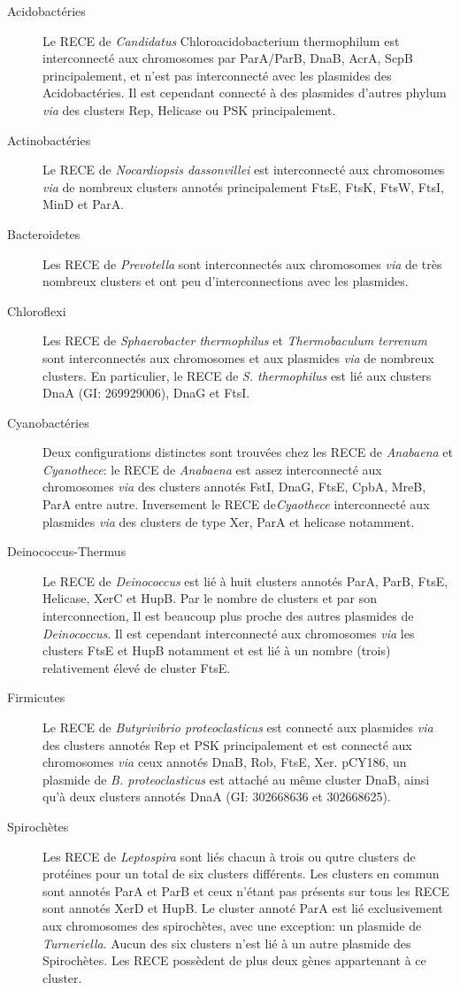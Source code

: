 \begin{description}
\begin{itemize}
 	\end{itemize}
\item[Acidobactéries] Le RECE de \textit{Candidatus} Chloroacidobacterium thermophilum est interconnecté aux chromosomes par ParA/ParB, DnaB, AcrA, ScpB principalement, et n'est pas interconnecté avec les plasmides des Acidobactéries. Il est cependant connecté à des plasmides d'autres phylum \textit{via} des clusters Rep, Helicase ou PSK principalement.
 \item[Actinobactéries] Le RECE de \textit{Nocardiopsis dassonvillei} est interconnecté aux chromosomes \textit{via} de nombreux clusters annotés principalement FtsE, FtsK, FtsW, FtsI, MinD et ParA.
 \item[Bacteroidetes] Les RECE de \textit{Prevotella} sont interconnectés aux chromosomes \textit{via} de très nombreux clusters et ont peu d'interconnections avec les plasmides.
 \item[Chloroflexi] Les RECE de \textit{Sphaerobacter thermophilus} et \textit{Thermobaculum terrenum} sont interconnectés aux chromosomes et aux plasmides \textit{via} de nombreux clusters. En particulier, le RECE de \textit{S. thermophilus} est lié aux clusters DnaA (GI: 269929006), DnaG et FtsI. 
 \item[Cyanobactéries] Deux configurations distinctes sont trouvées chez les RECE de \textit{Anabaena} et \textit{Cyanothece}: le RECE de \textit{Anabaena} est assez interconnecté aux chromosomes \textit{via} des clusters annotés FstI, DnaG, FtsE, CpbA, MreB, ParA entre autre. Inversement le RECE de\textit{Cyaothece} interconnecté aux plasmides \textit{via} des clusters de type Xer, ParA et helicase notamment.
\item[Deinococcus-Thermus] Le RECE de \textit{Deinococcus} est lié à huit clusters annotés ParA, ParB, FtsE, Helicase, XerC et HupB. Par le nombre de clusters et par son interconnection, Il est beaucoup plus proche des autres plasmides de \textit{Deinococcus}. Il est cependant interconnecté aux chromosomes \textit{via} les clusters FtsE et HupB notamment et est lié à un nombre (trois) relativement élevé de cluster FtsE. 
 \item[Firmicutes] Le RECE de \textit{Butyrivibrio proteoclasticus} est connecté aux plasmides \textit{via} des clusters annotés Rep et PSK principalement et est connecté aux chromosomes \textit{via} ceux annotés DnaB, Rob, FtsE, Xer. pCY186, un plasmide de \textit{B. proteoclasticus} est attaché au même cluster DnaB, ainsi qu'à deux clusters annotés DnaA (GI: 302668636 et 302668625).
 \item[Spirochètes] Les RECE de \textit{Leptospira} sont liés chacun à trois ou qutre clusters de protéines pour un total de six clusters différents. Les clusters en commun sont annotés ParA et ParB et ceux n'étant pas présents sur tous les RECE sont annotés XerD et HupB. Le cluster annoté ParA est lié exclusivement aux chromosomes des spirochètes, avec une exception: un plasmide de \textit{Turneriella}. Aucun des six clusters n'est lié à un autre plasmide des Spirochètes. Les RECE possèdent de plus deux gènes appartenant à ce cluster. 
\end{description}  
 
